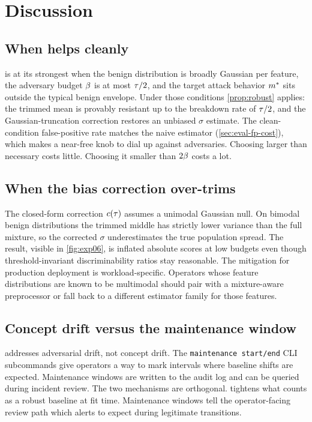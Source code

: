 \section{Discussion}
\label{sec:discussion}

\subsection{When \sediment{} helps cleanly}

\sediment{} is at its strongest when the benign distribution is
broadly Gaussian per feature, the adversary budget $\beta$ is at
most $\tau/2$, and the target attack behavior $m^{*}$ sits
outside the typical benign envelope. Under those conditions
\cref{prop:robust} applies: the trimmed mean is provably resistant
up to the breakdown rate of $\tau/2$, and the Gaussian-truncation
correction restores an unbiased $\sigma$ estimate. The
clean-condition false-positive rate matches the naive estimator
(\cref{sec:eval-fp-cost}), which makes \trim{} a near-free knob
to dial up against adversaries. Choosing \trim{} larger than
necessary costs little. Choosing it smaller than $2\beta$ costs a
lot.

\subsection{When the bias correction over-trims}

The closed-form correction $c(\tau)$ assumes a unimodal Gaussian
null. On bimodal benign distributions the trimmed middle has
strictly lower variance than the full mixture, so the corrected
$\sigma$ underestimates the true population spread. The result,
visible in \cref{fig:exp06}, is inflated absolute scores at low
budgets even though threshold-invariant discriminability ratios
stay reasonable. The mitigation for production deployment is
workload-specific. Operators whose feature distributions are known
to be multimodal should pair \sediment{} with a mixture-aware
preprocessor or fall back to a different estimator family for
those features.

\subsection{Concept drift versus the maintenance window}

\sediment{} addresses adversarial drift, not concept drift. The
\texttt{maintenance start/end} CLI subcommands give operators a way
to mark intervals where baseline shifts are expected. Maintenance
windows are written to the audit log and can be queried during
incident review. The two mechanisms are orthogonal. \sediment{}
tightens what counts as a robust baseline at fit time. Maintenance
windows tell the operator-facing review path which alerts to expect
during legitimate transitions.

